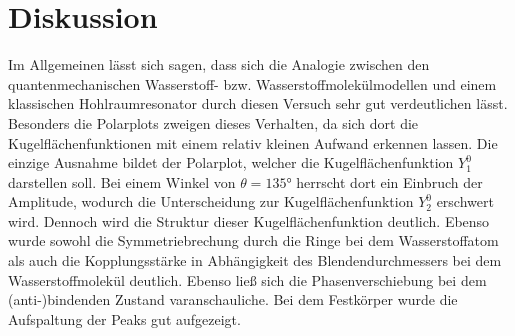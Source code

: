 \section{Diskussion}
\label{sec:Diskussion}
Im Allgemeinen lässt sich sagen, dass sich die Analogie zwischen den quantenmechanischen Wasserstoff- bzw. Wasserstoffmolekülmodellen und einem klassischen 
Hohlraumresonator durch diesen Versuch sehr gut verdeutlichen lässt. 
Besonders die Polarplots zweigen dieses Verhalten, da sich dort die Kugelflächenfunktionen mit einem relativ kleinen Aufwand erkennen lassen. Die einzige Ausnahme bildet
der Polarplot, welcher die Kugelflächenfunktion $Y_1^0$ darstellen soll. 
Bei einem Winkel von $\theta = \ang{135}$ herrscht dort ein Einbruch der Amplitude, wodurch die Unterscheidung zur Kugelflächenfunktion $Y_2^0$ erschwert wird.
Dennoch wird die Struktur dieser Kugelflächenfunktion deutlich.
Ebenso wurde sowohl die Symmetriebrechung durch die Ringe bei dem Wasserstoffatom als auch die Kopplungsstärke in Abhängigkeit des Blendendurchmessers bei
dem Wasserstoffmolekül deutlich.
Ebenso ließ sich die Phasenverschiebung bei dem (anti-)bindenden Zustand varanschauliche.
Bei dem Festkörper wurde die Aufspaltung der Peaks gut aufgezeigt.